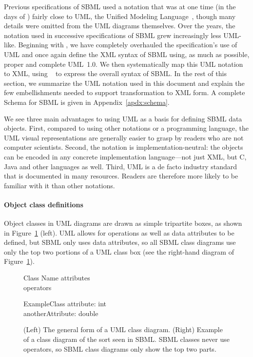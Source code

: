 
Previous specifications of SBML used a notation that was at one
time (in the days of \sbmlone) fairly close to UML, the Unified
Modeling Language~\citep{eriksson:1998,oestereich:1999}, though
many details were omitted from the UML diagrams themselves.  Over
the years, the notation used in successive specifications of SBML
grew increasingly less UML-like.  Beginning with \sbmltwothree, we
have completely overhauled the specification's use of UML and once
again define the XML syntax of SBML using, as much as possible, proper
and complete UML~1.0.  We then systematically map this UML
notation to XML, using \xmlschemaone~\citep{biron:2000,fallside:2000,thompson:2000} to express
the overall syntax of SBML.  In the rest of this section, we
summarize the UML notation used in this document and explain the
few embellishments needed to support transformation to XML form.
A complete Schema for SBML is given in Appendix~\ref{apdx:schema}.

We see three main advantages to using UML as a basis for defining
SBML data objects.  First, compared to using other notations or
a programming language, the UML visual representations are
generally easier to grasp by readers who are not computer
scientists.  Second, the notation is implementation-neutral: the
objects can be encoded in any concrete implementation
language---not just XML, but C, Java and other languages as well.
Third, UML is a de facto industry standard that is documented in
many resources.  Readers are therefore more likely to be familiar
with it than other notations.


\paragraph{Object class definitions}

Object classes in UML diagrams are drawn as simple tripartite
boxes, as shown in Figure~\ref{fig:simple-class-eg} (left).  UML
allows for operations as well as data attributes to be defined,
but SBML only uses data attributes, so all SBML class diagrams use
only the top two portions of a UML class box (see the right-hand
diagram of Figure~\ref{fig:simple-class-eg}).

\begin{figure}[htb]
  \centering
  \small
  \begin{classbox}{Class Name}
    attributes\\
    \hline
    operators\\
  \end{classbox}
  \quad  \quad  \quad  \quad
  \begin{classbox}{ExampleClass}
    attribute: int \\
    anotherAttribute: double\\
  \end{classbox}
  \caption{(Left) The general form of a UML class
      diagram.  (Right) Example of a class diagram of the sort
      seen in SBML.  SBML classes never use operators, so SBML
      class diagrams only show the top two parts.}
  \label{fig:simple-class-eg}
\end{figure}

